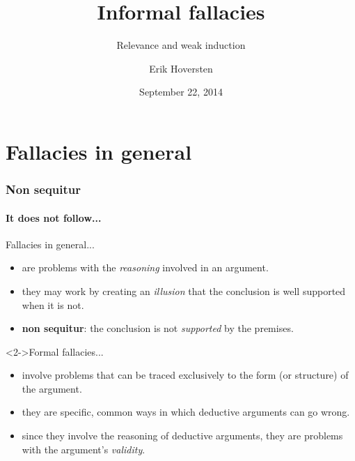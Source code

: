 \documentclass[10pt,letterpaper,xcolor=dvipsnames,handout]{beamer}
\title{Informal fallacies}
\subtitle{Relevance and weak induction}
\author[Hoversten]{Erik Hoversten}
\institute[lrp-f14]{Logic, reason, and persuasion: fall 2014 \\ Rutgers University}
\date[09/22/2014]{September 22, 2014}
\begin{document}
\begin{frame}
\titlepage
\end{frame}

\section{Fallacies in general}

\begin{frame}
\frametitle{Non sequitur}
\framesubtitle{It does not follow...}

\begin{block}{Fallacies in general...}
  \begin{itemize}
    \item are problems with the \textit{reasoning} involved in an argument.
    \item they may work by creating an \textit{illusion} that the conclusion is well supported when it is not.
    \item \textbf{non sequitur}: the conclusion is not \textit{supported} by the premises.
  \end{itemize}
\end{block}

\begin{block}<2->{Formal fallacies...}
  \begin{itemize}
    \item involve problems that can be traced exclusively to the form (or structure) of the argument.
    \item they are specific, common ways in which deductive arguments can go wrong.
    \item since they involve the reasoning of deductive arguments, they are problems with the argument's \textit{validity}.
  \end{itemize}
\end{block}

\end{frame}
\end{document}
